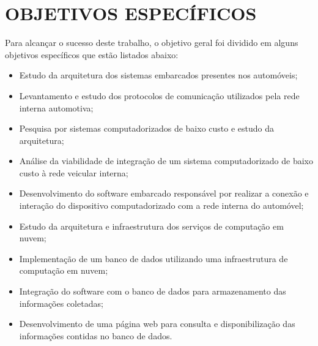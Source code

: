 \section{OBJETIVOS ESPECÍFICOS}
Para alcançar o sucesso deste trabalho, o objetivo geral foi dividido em alguns objetivos específicos que estão listados abaixo:
\begin{itemize}
\item Estudo da arquitetura dos sistemas embarcados presentes nos automóveis;
\item Levantamento e estudo dos protocolos de comunicação utilizados pela rede interna automotiva;
\item Pesquisa por sistemas computadorizados de baixo custo e estudo da arquitetura;
\item Análise da viabilidade de integração de um sistema computadorizado de baixo custo à rede veicular interna;
\item Desenvolvimento do software embarcado responsável por realizar a conexão e interação do dispositivo computadorizado com a rede interna do automóvel;
\item Estudo da arquitetura e infraestrutura dos serviços de computação em nuvem;
\item Implementação de um banco de dados utilizando uma infraestrutura de computação em nuvem;
\item Integração do software com o banco de dados para armazenamento das informações coletadas;
\item Desenvolvimento de uma página web para consulta e disponibilização das informações contidas no banco de dados.
\end{itemize}

